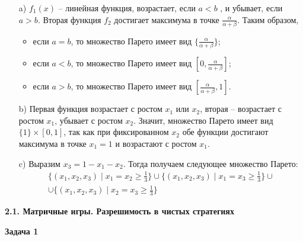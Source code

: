 \documentclass[a4paper,14pt]{extreport}
\begin{document}
\begin{itemize}
	\item[a)] $f_1(x)$ -- линейная функция, возрастает, если $a < b$ , и убывает, если $a > b$. Вторая функция $f_2$ достигает максимума в точке $\frac{\alpha}{\alpha+\beta}$. Таким образом,
	\begin{itemize}
		\item если $a=b$, то множество Парето имеет вид $\{\frac{\alpha}{\alpha+\beta}\}$;
		\item если $a<b$, то множество Парето имеет вид $\left[ 0, \frac{\alpha}{\alpha+\beta}\right]$;
		\item если $a>b$, то множество Парето имеет вид $\left[\frac{\alpha}{\alpha+\beta}, 1\right]$.
	\end{itemize}

	\item[b)] Первая функция возрастает с ростом $x_1$ или $x_2$, вторая – возрастает с ростом $x_1$, убывает с ростом $x_2$. Значит, множество Парето имеет вид $\{1\} \times [0, 1]$, так как при фиксированном $x_2$ обе функции достигают максимума в точке $x_1 = 1$ и возрастают с ростом $x_1$.

	\item[c)] Выразим $x_3 = 1 - x_1 - x_2$. Тогда получаем следующее множество Парето:
\begin{equation*}
\begin{split}
	\{ (x_1, x_2, x_3) \mid x_1 = x_2 \ge \frac{1}{3} \} \cup \{ (x_1, x_2, x_3) \mid x_1 = x_3 \ge \frac{1}{3} \} \cup \\
\cup \{ (x_1, x_2, x_3) \mid x_2 = x_3 \ge \frac{1}{3} \}
\end{split}
\end{equation*}

\end{itemize}

\begin{center}
	\textbf{2.1. Матричные игры. Разрешимость в чистых стратегиях}
\end{center}

\textbf{Задача 1}
\end{document}
